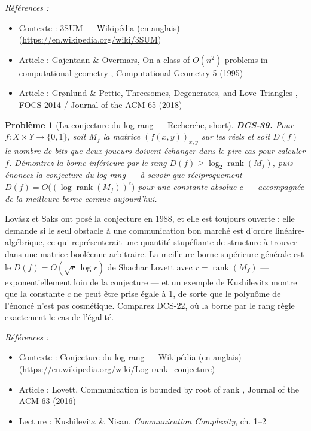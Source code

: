 \documentclass[11pt]{article}
\newtheorem{problem}{Problème}
\newenvironment{refs}{\par\small\noindent\emph{Références :}\begin{itemize}\setlength\itemsep{0pt}}{\end{itemize}\normalsize}
\begin{document}
\begin{refs}
\item Contexte : 3SUM --- Wikipédia (en anglais) (\url{https://en.wikipedia.org/wiki/3SUM})
\item Article : Gajentaan \& Overmars, \og{} On a class of $O(n^2)$ problems in computational geometry \fg{}, Computational Geometry 5 (1995)
\item Article : Grønlund \& Pettie, \og{} Threesomes, Degenerates, and Love Triangles \fg{}, FOCS 2014 / Journal of the ACM 65 (2018)
\end{refs}

\bigskip

\begin{problem}[{La conjecture du log-rang --- Recherche, short}]
\textbf{DCS-39.} Pour $f : X \times Y \to \{0,1\}$, soit $M_f$ la matrice $(f(x,y))_{x,y}$ sur les réels et soit $D(f)$ le nombre de bits que deux joueurs doivent échanger dans le pire cas pour calculer $f$. Démontrez la borne inférieure par le rang $D(f) \ge \log_2 \operatorname{rank}(M_f)$, puis énoncez la conjecture du log-rang --- à savoir que réciproquement $D(f) = O\big((\log \operatorname{rank}(M_f))^{c}\big)$ pour une constante absolue $c$ --- accompagnée de la meilleure borne connue aujourd'hui.
\end{problem}

\noindent Lovász et Saks ont posé la conjecture en 1988, et elle est toujours ouverte : elle demande si le seul obstacle à une communication bon marché est d'ordre linéaire-algébrique, ce qui représenterait une quantité stupéfiante de structure à trouver dans une matrice booléenne arbitraire. La meilleure borne supérieure générale est le $D(f) = O(\sqrt{r}\,\log r)$ de Shachar Lovett avec $r = \operatorname{rank}(M_f)$ --- exponentiellement loin de la conjecture --- et un exemple de Kushilevitz montre que la constante $c$ ne peut être prise égale à 1, de sorte que le polynôme de l'énoncé n'est pas cosmétique. Comparez DCS-22, où la borne par le rang règle exactement le cas de l'égalité.

\begin{refs}
\item Contexte : Conjecture du log-rang --- Wikipédia (en anglais) (\url{https://en.wikipedia.org/wiki/Log-rank_conjecture})
\item Article : Lovett, \og{} Communication is bounded by root of rank \fg{}, Journal of the ACM 63 (2016)
\item Lecture : Kushilevitz \& Nisan, \textit{Communication Complexity}, ch. 1--2
\end{refs}
\end{document}
